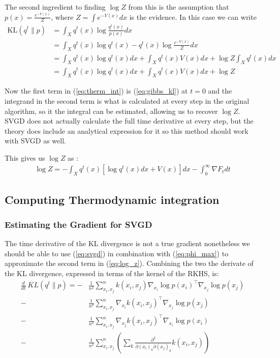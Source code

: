 \documentclass{article}
\begin{document}
    The second ingredient to finding $\log Z$ from this is the assumption that $p(x) = \frac{ e^{-V(x)} }{ Z }$, 
    where $Z = \int e^{-V(x)} dx$ is the evidence. In this case we can write
    \begin{align}
    \label{eq:gibbs_kl}
        \text{KL}( q^t \| p ) &= \int_X q^t(x) \log \frac{ q^t(x) }{ p(x) } dx \\
                        &= \int_X q^t(x) \log q^t(x) - q^t(x) \log \frac{ e^{-V(x)} }{ Z } dx \\
                        &= \int_X q^t(x) \log q^t(x) dx + \int_X q^t(x) V(x) dx + \log Z \int_X q^t(x) dx \\
                        &= \int_X q^t(x) \log q^t(x) dx + \int_X q^t(x) V(x) dx + \log Z
    \end{align}

    Now the first term in (\ref{eq:therm_int}) is (\ref{eq:gibbs_kl}) at $t=0$ and the integrand in the second term is
    what is calculated at every step in the original algorithm, so it the integral can be estimated, allowing us to 
    recover $\log Z$. SVGD does not actually calculate the full time derivative at every step, but the theory does 
    include an analytical expression for it so this method should work with SVGD as well.

    This gives us $\log Z$ as :
    \begin{align}
    \label{eq:log_z}
        \log Z = - \int_X q^t(x) [\log q^t(x) dx +  V(x)] dx 
            - \int_0^\infty \nabla F_t dt
    \end{align}


    \newpage

\subsection{Computing Thermodynamic integration}
\subsubsection{Estimating the Gradient for SVGD}
    The time derivative of the KL divergence is not a true gradient nonetheless we should be able to use
    (\ref{eq:svgd}) in combination with (\ref{eq:phi_max}) to approximate the second term in (\ref{eq:log_z}).
    Combining the two the derivate of the KL divergence, expressed in terms of the kernel of the RKHS, is:
    \begin{align}
        \label{eq:F_approximation}
        \frac{d}{dt}\ KL( q^t \| p ) = -& \frac{1}{n^2}\sum_{x_i,x_j}^n  k(x_i,x_j) \nabla_{x_i} \log p(x_i)^\top \nabla_{x_j} \log p(x_j)  \\ 
        -& \frac{1}{n^2}\sum_{x_i,x_j}^n  \nabla_{x_i} k(x_i,x_j)^\top \nabla_{x_j} \log p(x_j)  \\ 
        -& \frac{1}{n^2}\sum_{x_i,x_j}^n  \nabla_{x_j} k(x_i,x_j)^\top \nabla_{x_i} \log p(x_i)  \\ 
        -& \frac{1}{n^2}\sum_{x_i,x_j}^n \left( \sum_k \frac{ \partial^2 }{ \partial (x_i)_k \partial (x_j)_k } 
            k(x_i,x_j) \right)
    \end{align}
\end{document}

